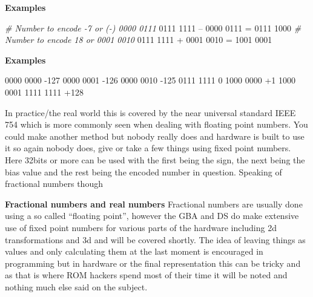 \documentclass[
]{book}
\newenvironment{Shaded}{\begin{snugshade}}{\end{snugshade}}
\newcommand{\CommentTok}[1]{\textcolor[rgb]{0.56,0.35,0.01}{\textit{#1}}}
\newcommand{\DecValTok}[1]{\textcolor[rgb]{0.00,0.00,0.81}{#1}}
\newcommand{\NormalTok}[1]{#1}
\newcommand{\OtherTok}[1]{\textcolor[rgb]{0.56,0.35,0.01}{#1}}
\newcommand{\SpecialCharTok}[1]{\textcolor[rgb]{0.00,0.00,0.00}{#1}}
\begin{document}
\textbf{Examples}

\begin{Shaded}
\begin{Highlighting}[]
\CommentTok{\# Number to encode {-}7 or ({-}) 0000 0111}
\DecValTok{0111} \DecValTok{1111}\NormalTok{ – }\DecValTok{0000} \DecValTok{0111} \OtherTok{=} \DecValTok{0111} \DecValTok{1000}
\CommentTok{\# Number to encode 18 or 0001 0010}
\DecValTok{0111} \DecValTok{1111} \SpecialCharTok{+} \DecValTok{0001} \DecValTok{0010} \OtherTok{=} \DecValTok{1001} \DecValTok{0001}
\end{Highlighting}
\end{Shaded}

\textbf{Examples}

\begin{Shaded}
\begin{Highlighting}[]
\DecValTok{0000} \DecValTok{0000} \SpecialCharTok{{-}}\DecValTok{127}
\DecValTok{0000} \DecValTok{0001} \SpecialCharTok{{-}}\DecValTok{126}
\DecValTok{0000} \DecValTok{0010} \SpecialCharTok{{-}}\DecValTok{125}
\DecValTok{0111} \DecValTok{1111} \DecValTok{0}
\DecValTok{1000} \DecValTok{0000} \SpecialCharTok{+}\DecValTok{1}
\DecValTok{1000} \DecValTok{0001} \DecValTok{1111} \DecValTok{1111} \SpecialCharTok{+}\DecValTok{128}
\end{Highlighting}
\end{Shaded}

In practice/the real world this is covered by the near universal standard IEEE 754 which is more commonly seen when dealing with floating point numbers. You could make another method but nobody really does and hardware is built to use it so again nobody does, give or take a few things using fixed point numbers. Here 32bits or more can be used with the first being the sign, the next being the bias value and the rest being the encoded number in question. Speaking of fractional numbers though

\textbf{Fractional numbers and real numbers} Fractional numbers are usually done using a so called ``floating point'', however the GBA and DS do make extensive use of fixed point numbers for various parts of the hardware including 2d transformations and 3d and will be covered shortly. The idea of leaving things as values and only calculating them at the last moment is encouraged in programming but in hardware or the final representation this can be tricky and as that is where ROM hackers spend most of their time it will be noted and nothing much else said on the subject.
\end{document}
